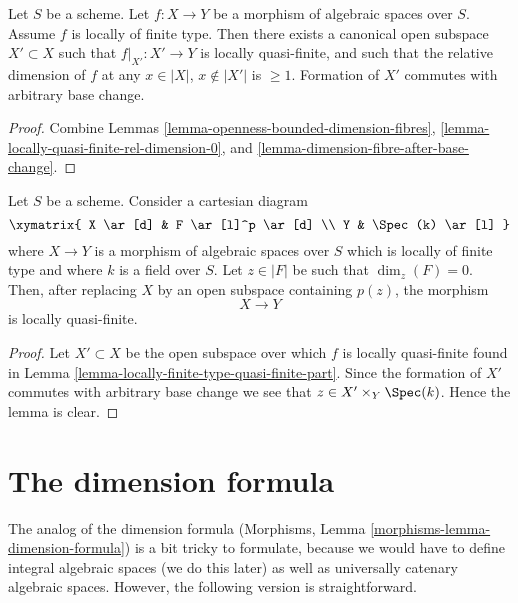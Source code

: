\begin{lemma}
\label{lemma-locally-finite-type-quasi-finite-part}
Let $S$ be a scheme.
Let $f : X \to Y$ be a morphism of algebraic spaces over $S$.
Assume $f$ is locally of finite type.
Then there exists a canonical open subspace $X' \subset X$ such that
$f|_{X'} : X' \to Y$ is locally quasi-finite, and such that the
relative dimension of $f$ at any $x \in |X|$, $x \not \in |X'|$ is
$\geq 1$. Formation of $X'$ commutes with arbitrary base change.
\end{lemma}

\begin{proof}
Combine
Lemmas \ref{lemma-openness-bounded-dimension-fibres},
\ref{lemma-locally-quasi-finite-rel-dimension-0}, and
\ref{lemma-dimension-fibre-after-base-change}.
\end{proof}

\begin{lemma}
\label{lemma-quasi-finite-at-point}
Let $S$ be a scheme. Consider a cartesian diagram
$$
\xymatrix{
X \ar[d] & F \ar[l]^p \ar[d] \\
Y & \Spec(k) \ar[l]
}
$$
where $X \to Y$ is a morphism of algebraic spaces over $S$ which is
locally of finite type and where $k$ is a field over $S$.
Let $z \in |F|$ be such that $\dim_z(F) = 0$. Then, after replacing $X$
by an open subspace containing $p(z)$, the morphism
$$
X \longrightarrow Y
$$
is locally quasi-finite.
\end{lemma}

\begin{proof}
Let $X' \subset X$ be the open subspace over which $f$ is locally quasi-finite
found in
Lemma \ref{lemma-locally-finite-type-quasi-finite-part}.
Since the formation of $X'$ commutes with arbitrary base change we see
that $z \in X' \times_Y \Spec(k)$. Hence the lemma is clear.
\end{proof}





\section{The dimension formula}
\label{section-dimension-formula}

\noindent
The analog of the dimension formula
(Morphisms, Lemma \ref{morphisms-lemma-dimension-formula})
is a bit tricky to formulate, because we would have to define
integral algebraic spaces (we do this later) as well as
universally catenary algebraic spaces. However, the
following version is straightforward.

